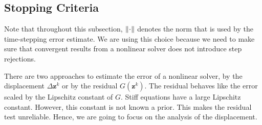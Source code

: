 \documentclass[a4paper,9pt]{article}
\theoremstyle{definition}
\theoremstyle{remark}
\begin{document}
\subsection{Stopping Criteria}
Note that throughout this subsection, $\norm{\cdot}$ denotes the norm that is
used by the time-stepping error estimate. We are using this choice because we
need to make sure that convergent results from a nonlinear solver does not
introduce step rejections.

There are two approaches to estimate the error of a nonlinear solver, by the
displacement $\Delta \bm{z}^k$ or by the residual $G(\bm{z}^k)$. The residual
behaves like the error scaled by the Lipschitz constant of $G$. Stiff equations
have a large Lipschitz constant. However, this constant is not known a prior.
This makes the residual test unreliable. Hence, we are going to focus on the
analysis of the displacement.
\end{document}
